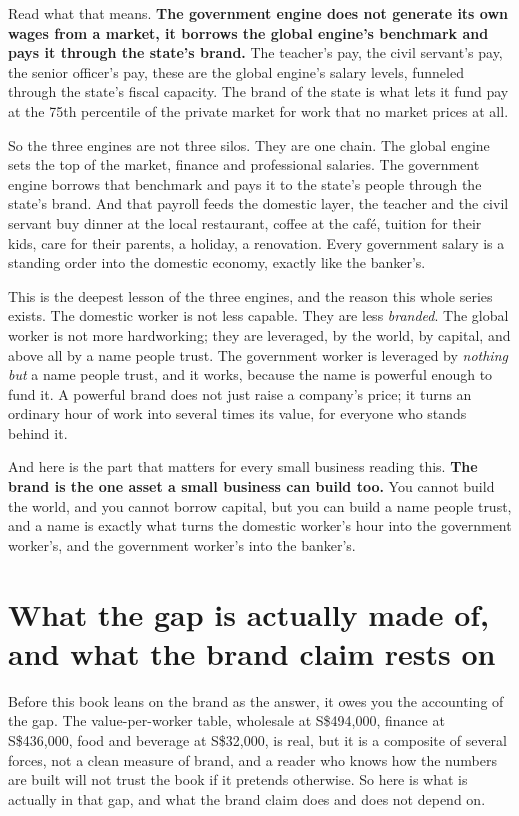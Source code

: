 \documentclass[10pt,twoside,openany]{memoir}
\newcommand{\needspacehead}{\needspace{4\baselineskip}}
\let\oldsection\section
\renewcommand{\section}{\needspacehead\oldsection}
\begin{document}
{{{{Read what that means. \textbf{The government engine does not generate
its own wages from a market, it borrows the global engine's benchmark
and pays it through the state's brand.} The teacher's pay, the civil
servant's pay, the senior officer's pay, these are the global engine's
salary levels, funneled through the state's fiscal capacity. The brand
of the state is what lets it fund pay at the 75th percentile of the
private market for work that no market prices at all.

So the three engines are not three silos. They are one chain. The global
engine sets the top of the market, finance and professional salaries.
The government engine borrows that benchmark and pays it to the state's
people through the state's brand. And that payroll feeds the domestic
layer, the teacher and the civil servant buy dinner at the local
restaurant, coffee at the café, tuition for their kids, care for their
parents, a holiday, a renovation. Every government salary is a standing
order into the domestic economy, exactly like the banker's.

This is the deepest lesson of the three engines, and the reason this
whole series exists. The domestic worker is not less capable. They are
less \emph{branded}. The global worker is not more hardworking; they are
leveraged, by the world, by capital, and above all by a name people
trust. The government worker is leveraged by \emph{nothing but} a name
people trust, and it works, because the name is powerful enough to fund
it. A powerful brand does not just raise a company's price; it turns an
ordinary hour of work into several times its value, for everyone who
stands behind it.

And here is the part that matters for every small business reading this.
\textbf{The brand is the one asset a small business can build too.} You
cannot build the world, and you cannot borrow capital, but you can build
a name people trust, and a name is exactly what turns the domestic
worker's hour into the government worker's, and the government worker's
into the banker's.

\section{What the gap is actually made of, and what the brand claim
rests
on}\label{what-the-gap-is-actually-made-of-and-what-the-brand-claim-rests-on}

Before this book leans on the brand as the answer, it owes you the
accounting of the gap. The value-per-worker table, wholesale at
S\$494,000, finance at S\$436,000, food and beverage at S\$32,000, is
real, but it is a composite of several forces, not a clean measure of
brand, and a reader who knows how the numbers are built will not trust
the book if it pretends otherwise. So here is what is actually in that
gap, and what the brand claim does and does not depend on.

}}}}
\end{document}
